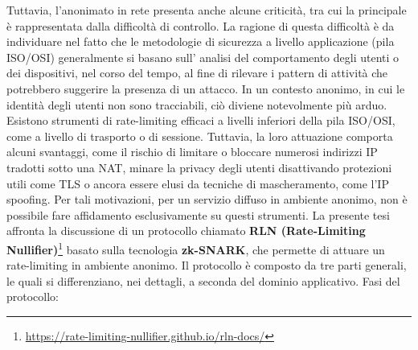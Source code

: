 Tuttavia, l'anonimato in rete presenta anche alcune criticità, tra cui la principale è rappresentata dalla difficoltà di
controllo. La ragione di questa difficoltà è da individuare nel fatto che le metodologie di sicurezza a livello applicazione (pila ISO/OSI)
generalmente si basano sull' analisi del comportamento degli utenti o dei dispositivi, nel corso del tempo, al
fine di rilevare i pattern di attività che potrebbero suggerire la presenza di un attacco. In un contesto anonimo, in
cui le identità degli utenti non sono tracciabili, ciò diviene notevolmente più arduo. Esistono strumenti di
rate-limiting efficaci a livelli inferiori della pila ISO/OSI, come a livello di trasporto o di sessione. Tuttavia, la
loro attuazione comporta alcuni svantaggi, come il rischio di limitare o bloccare numerosi indirizzi IP tradotti sotto
una NAT, minare la privacy degli utenti disattivando protezioni utili come TLS o ancora essere elusi da
tecniche di mascheramento, come l'IP spoofing. Per tali motivazioni, per un servizio diffuso in ambiente anonimo, non è
possibile fare affidamento esclusivamente su questi strumenti.
\clearpage
La presente tesi affronta la discussione di un protocollo chiamato \textbf{RLN (Rate-Limiting Nullifier)}\footnote{\url{https://rate-limiting-nullifier.github.io/rln-docs/}} basato sulla tecnologia
\textbf{zk-SNARK}, che permette di attuare un rate-limiting in ambiente anonimo. Il protocollo è composto da tre parti generali,
le quali si differenziano, nei dettagli, a seconda del dominio applicativo.
Fasi del protocollo:

